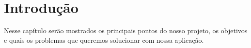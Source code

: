 
\chapter[Introdução]{Introdução}

Nesse capítulo serão mostrados os principais pontos do nosso projeto, os objetivos e quais os problemas que queremos solucionar com nossa aplicação.










